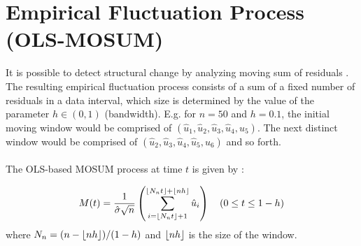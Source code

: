 \documentclass[main.tex]{subfiles}
\begin{document}
\section{Empirical Fluctuation Process (OLS-MOSUM)}
\label{sec:empirical_fluctuation}
It is possible to detect structural change by analyzing moving sum of residuals
\cite{strucchange}. The resulting empirical fluctuation process consists of a
sum of a fixed number of residuals in a data interval, which size is determined
by the value of the parameter $h \in (0,1)$ (bandwidth). E.g. for $n=50$ and $h=0.1$,
the initial moving window would be comprised of $(\hat{u}_1, \hat{u}_2,\hat{u}_3, \hat{u}_4,
\hat{u}_5)$. The next distinct window would be comprised of
$(\hat{u}_2,\hat{u}_3, \hat{u}_4, \hat{u}_5, \hat{u}_6)$ and so forth.\\\\
The OLS-based MOSUM process at time $t$ is given by \cite{mosum_tests}:

\begin{equation}\label{eq:mosum_og}
M(t)=\frac{1}{\hat{\sigma} \sqrt{n}}
\left(\sum_{i=\lfloor N_{n} t\rfloor+1}^{\left\lfloor N_{n} t\right\rfloor+\lfloor
  n h\rfloor} \hat{u}_{i}\right) \quad(0 \leq t \leq 1-h)
\end{equation}
where $N_{n}=(n-\lfloor n h\rfloor) /(1-h)$ and $\lfloor n h\rfloor$ is the size of the
window. 
\end{document}
